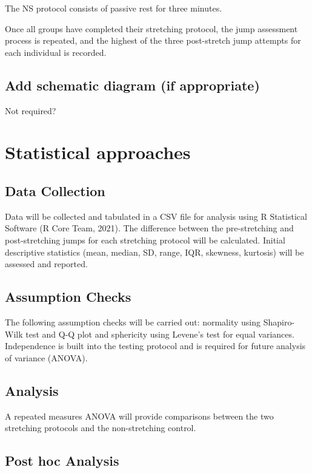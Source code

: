\documentclass[stu, floatsintext, a4paper]{apa7}
\begin{document}
The NS protocol consists of passive rest for three minutes.

Once all groups have completed their stretching protocol, the jump assessment process is repeated, and the highest of the three post-stretch jump attempts for each individual is recorded.

\subsection{Add schematic diagram (if appropriate)}
\label{sec:org225b031}

Not required?

\section{Statistical approaches}
\label{sec:orgd6cc046}

\subsection{Data Collection}
\label{sec:org43cca6f}

Data will be collected and tabulated in a CSV file for analysis using R Statistical Software (R Core Team, 2021). The difference between the pre-stretching and post-stretching jumps for each stretching protocol will be calculated. Initial descriptive statistics (mean, median, SD, range, IQR, skewness, kurtosis) will be assessed and reported.

\subsection{Assumption Checks}
\label{sec:orgde37186}

The following assumption checks will be carried out: normality using Shapiro-Wilk test and Q-Q plot and sphericity using Levene's test for equal variances. Independence is built into the testing protocol and is required for future analysis of variance (ANOVA).

\subsection{Analysis}
\label{sec:orgd66aa4b}

A repeated measures ANOVA will provide comparisons between the two stretching protocols and the non-stretching control.

\subsection{Post hoc Analysis}
\label{sec:orgd655d5e}
\end{document}
